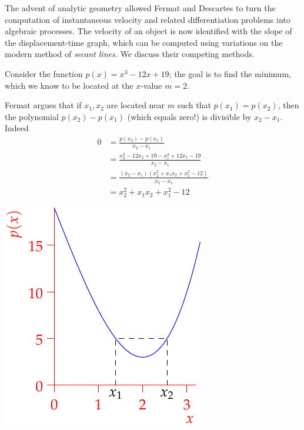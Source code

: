 
The advent of analytic geometry allowed Fermat and Descartes to turn the computation of instantaneous velocity and related differentiation problems into algebraic processes. The velocity of an object is now identified with the slope of the displacement-time graph, which can be computed using variations on the modern method of \emph{secant lines.} We discuss their competing methods.

\begin{minipage}[t]{0.63\linewidth}\vspace{0pt}
	
	Consider the function $p(x)=x^3-12x+19$; the goal is to find the minimum, which we know to be located at the $x$-value $m=2$.\par
	Fermat argues that if $x_1,x_2$ are located near $m$ such that $p(x_1)=p(x_2)$, then the polynomial $p(x_2)-p(x_1)$ (which equals zero!) is divisible by $x_2-x_1$. Indeed
	\begin{align*}
	0&=\frac{p(x_2)-p(x_1)}{x_2-x_1}\\
	&=\frac{x_2^3-12x_2+19-x_1^3+12x_1-19}{x_2-x_1}\\
	&=\frac{(x_2-x_1)(x_2^2+x_1x_2+x_1^2-12)}{x_2-x_1}\\
	&=x_2^2+x_1x_2+x_1^2-12
	\end{align*}
\end{minipage}\hfill\begin{minipage}[t]{0.35\linewidth}\vspace{0pt}
	\flushright\includegraphics{analytic-adequation}
\end{minipage}\medbreak

